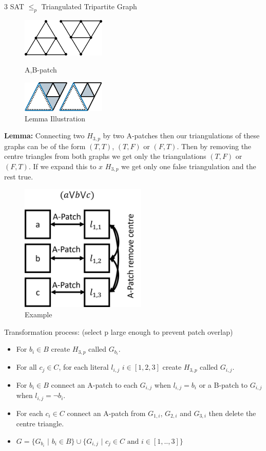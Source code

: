 \documentclass[final]{beamer}
\newlength{\colwidth}
\newcounter{col}
\begin{document}
\begin{frame}[t]
\begin{columns}[t]
\begin{column}{\colwidth}
\begin{block}{3 SAT $\leq_p$ Triangulated Tripartite Graph \cite{doi:10.1137/0210054}}
\begin{figure}
\includegraphics[width=40mm]{patches.png}
		\caption{A,B-patch}
		\includegraphics[width=40mm]{lemma.png}
		\caption{Lemma Illustration}
		\vspace{-70pt}
\end{figure}


\textbf{Lemma:} Connecting two $H_{3,p}$ by two A-patches then our triangulations of these graphs can be of the form $(T,T)$, $(T,F)$ or $(F,T)$. Then by removing the centre triangles from both graphs we get only the triangulations $(T,F)$ or $(F,T)$. If we expand this to $x$ $H_{3,p}$ we get only one false triangulation and the rest true.




\begin{figure}
		\label{fig:ex}
		\vspace{-80pt}
		\includegraphics[width=60mm]{ttg_example.png}	
		\caption{Example}
		\vspace{-30pt}
\end{figure}


Transformation process: (select p large enough to prevent patch overlap)
\begin{itemize}
\item For $b_i\in B$ create $H_{3,p}$ called $G_{b_i}$.
\item For all $c_j\in C$, for each literal $l_{i,j}$ $i\in [1,2,3]$ create $H_{3,p}$ called $G_{i,j}$.
\item For $b_i \in B$ connect an A-patch to each $G_{i,j}$ when $l_{i,j}=b_i$ or a B-patch to $G_{i,j}$ when $l_{i,j}=\neg b_i$. 
\item For each $c_i\in C$ connect an A-patch from $G_{1,i}$, $G_{2,i}$ and $G_{3,i}$ then delete the centre triangle. 
\item $G = \{G_{b_i}$ $|$ $b_i \in B\}\cup\{G_{i,j}$ $|$ $ c_j\in C\text{ and }i\in [1,..,3] \}$
\end{itemize}


\end{block}
\end{column}
\end{columns}
\end{frame}
\end{document}
